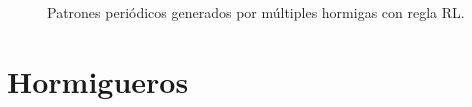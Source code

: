 \documentclass[12pt,twoside]{article}
\begin{document}
\begin{figure}[h!]
	\caption{Patrones periódicos generados por múltiples hormigas con regla RL.}
	\label{fig:rules_mul}
\end{figure}

\clearpage
\section{Hormigueros}


	\clearpage
	\begin{thebibliography}{99}
		\bibitem{}
		
	\end{thebibliography}
	
\end{document}
